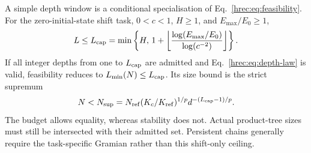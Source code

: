 A simple depth window is a conditional specialisation of Eq.~\eqref{hrec:eq:feasibility}. For the zero-initial-state shift task, \(0<c<1\), \(H\ge1\), and \(E_{\max}/E_0\ge1\),
\begin{equation}
 L\le L_{\rm cap}=\min\left\{H,\,
 1+\left\lfloor\frac{\log(E_{\max}/E_0)}{\log(c^{-2})}\right\rfloor\right\}.
 \label{hrec:eq:budget-cap}
\end{equation}
If all integer depths from one to \(L_{\rm cap}\) are admitted and Eq.~\eqref{hrec:eq:depth-law} is valid, feasibility reduces to \(L_{\min}(N)\le L_{\rm cap}\). Its size bound is the strict supremum
\begin{equation}
 N<N_{\rm sup}=N_{\rm ref}(K_c/K_{\rm ref})^{1/p}
 d^{-(L_{\rm cap}-1)/p}.
 \label{hrec:eq:conditional-size}
\end{equation}
The budget allows equality, whereas stability does not. Actual product-tree sizes must still be intersected with their admitted set. Persistent chains generally require the task-specific Gramian rather than this shift-only ceiling.

